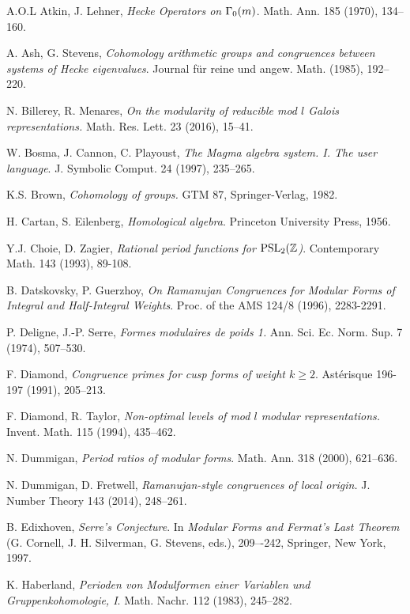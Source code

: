 \documentclass{amsart}
\theoremstyle{plain}
\theoremstyle{definition}
\numberwithin{equation}{section}
\newcommand{\Z}{{\mathbb Z}}
\begin{document}
\begin{thebibliography}{99}

 A.O.L Atkin, J. Lehner, \emph{Hecke Operators on $\Gamma_0(m)$}. 
Math. Ann. 185 (1970), 134--160.

 A. Ash, G. Stevens, \emph{Cohomology arithmetic groups and congruences 
between systems of Hecke eigenvalues}.
Journal f\"ur reine und angew. Math.  (1985), 192--220.

 N. Billerey, R. Menares, 
\emph{On the modularity of reducible mod $l$ Galois representations.} 
Math. Res. Lett. 23 (2016), 15--41.

  W. Bosma, J. Cannon, C. Playoust, \emph{The Magma algebra system. I. The user language}. 
 J. Symbolic Comput. 24 (1997), 235--265.

 K.S. Brown, \emph{Cohomology of groups.} GTM 87, Springer-Verlag, 1982.

 H. Cartan, S. Eilenberg, \emph{Homological algebra}. 
Princeton University Press, 1956. 

  Y.J. Choie, D. Zagier, \emph{Rational period functions for
$\PSL_2(\Z$)}. Contemporary Math. 143 (1993), 89-108.

 B. Datskovsky, P. Guerzhoy, 
\emph{On Ramanujan Congruences for Modular Forms of Integral and Half-Integral Weights}.
Proc. of the AMS  124/8  (1996), 2283-2291.

 P. Deligne, J.-P. Serre, \emph{Formes modulaires de poids 1.} Ann. Sci. Ec. Norm. Sup. 7 (1974),
507--530.

 F. Diamond, \emph{Congruence primes for cusp forms of weight $k\ge 2$}. Ast\'erisque 196-197 
(1991), 205--213.

  F. Diamond, R. Taylor, \emph{Non-optimal levels of mod $l$ 
modular representations.} Invent. Math. 115 (1994), 435--462.

 N. Dummigan, \emph{Period ratios of modular forms}. Math. Ann. 318 
(2000), 621--636.

 N. Dummigan, D. Fretwell, \emph{Ramanujan-style congruences of local origin.} 
J. Number Theory 143 (2014), 248--261.

 B. Edixhoven, \emph{Serre's Conjecture}. In \emph{Modular Forms and 
Fermat's Last Theorem} (G. Cornell, J. H. Silverman, G. Stevens, eds.), 
209–-242, Springer, New York, 1997.

 K. Haberland, \emph{Perioden von Modulformen einer Variablen und
Gruppenkohomologie, I}. Math. Nachr.  112 (1983), 245--282.


\end{thebibliography}
\end{document}
